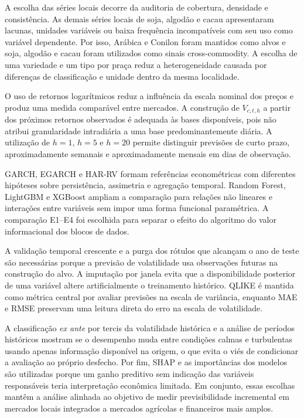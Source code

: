 \documentclass[a4paper,fleqn]{cas-sc}
\begin{document}
A escolha das séries locais decorre da auditoria de cobertura, densidade e consistência. As demais séries locais de soja, algodão e cacau apresentaram lacunas, unidades variáveis ou baixa frequência incompatíveis com seu uso como variável dependente. Por isso, Arábica e Conilon foram mantidos como alvos e soja, algodão e cacau foram utilizados como sinais cross-commodity. A escolha de uma variedade e um tipo por praça reduz a heterogeneidade causada por diferenças de classificação e unidade dentro da mesma localidade.

O uso de retornos logarítmicos reduz a influência da escala nominal dos preços e produz uma medida comparável entre mercados. A construção de \(V_{c,t,h}\) a partir dos próximos retornos observados é adequada às bases disponíveis, pois não atribui granularidade intradiária a uma base predominantemente diária. A utilização de \(h=1\), \(h=5\) e \(h=20\) permite distinguir previsões de curto prazo, aproximadamente semanais e aproximadamente mensais em dias de observação.

GARCH, EGARCH e HAR-RV formam referências econométricas com diferentes hipóteses sobre persistência, assimetria e agregação temporal. Random Forest, LightGBM e XGBoost ampliam a comparação para relações não lineares e interações entre variáveis sem impor uma forma funcional paramétrica. A comparação E1--E4 foi escolhida para separar o efeito do algoritmo do valor informacional dos blocos de dados.

A validação temporal crescente e a purga dos rótulos que alcançam o ano de teste são necessárias porque a previsão de volatilidade usa observações futuras na construção do alvo. A imputação por janela evita que a disponibilidade posterior de uma variável altere artificialmente o treinamento histórico. QLIKE é mantida como métrica central por avaliar previsões na escala de variância, enquanto MAE e RMSE preservam uma leitura direta do erro na escala de volatilidade.

A classificação \textit{ex ante} por tercis da volatilidade histórica e a análise de períodos históricos mostram se o desempenho muda entre condições calmas e turbulentas usando apenas informação disponível na origem, o que evita o viés de condicionar a avaliação ao próprio desfecho. Por fim, SHAP e as importâncias dos modelos são utilizadas porque um ganho preditivo sem indicação das variáveis responsáveis teria interpretação econômica limitada. Em conjunto, essas escolhas mantêm a análise alinhada ao objetivo de medir previsibilidade incremental em mercados locais integrados a mercados agrícolas e financeiros mais amplos.
\end{document}
